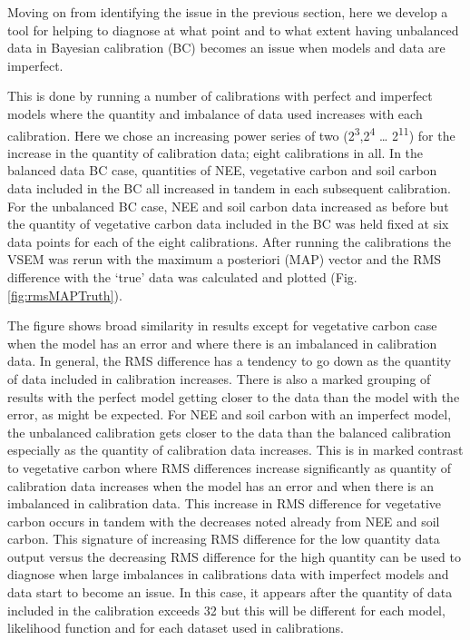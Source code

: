 \documentclass[]{article}
\begin{document}
Moving on from identifying the issue in the previous section, here we
develop a tool for helping to diagnose at what point and to what extent
having unbalanced data in Bayesian calibration (BC) becomes an issue
when models and data are imperfect.

This is done by running a number of calibrations with perfect and
imperfect models where the quantity and imbalance of data used increases
with each calibration. Here we chose an increasing power series of two
(2\textsuperscript{3},2\textsuperscript{4} \ldots{}
2\textsuperscript{11}) for the increase in the quantity of calibration
data; eight calibrations in all. In the balanced data BC case,
quantities of NEE, vegetative carbon and soil carbon data included in
the BC all increased in tandem in each subsequent calibration. For the
unbalanced BC case, NEE and soil carbon data increased as before but the
quantity of vegetative carbon data included in the BC was held fixed at
six data points for each of the eight calibrations. After running the
calibrations the VSEM was rerun with the maximum a posteriori (MAP)
vector and the RMS difference with the `true' data was calculated and
plotted (Fig. \ref{fig:rmsMAPTruth}).

The figure shows broad similarity in results except for vegetative
carbon case when the model has an error and where there is an imbalanced
in calibration data. In general, the RMS difference has a tendency to go
down as the quantity of data included in calibration increases. There is
also a marked grouping of results with the perfect model getting closer
to the data than the model with the error, as might be expected. For NEE
and soil carbon with an imperfect model, the unbalanced calibration gets
closer to the data than the balanced calibration especially as the
quantity of calibration data increases. This is in marked contrast to
vegetative carbon where RMS differences increase significantly as
quantity of calibration data increases when the model has an error and
when there is an imbalanced in calibration data. This increase in RMS
difference for vegetative carbon occurs in tandem with the decreases
noted already from NEE and soil carbon. This signature of increasing RMS
difference for the low quantity data output versus the decreasing RMS
difference for the high quantity can be used to diagnose when large
imbalances in calibrations data with imperfect models and data start to
become an issue. In this case, it appears after the quantity of data
included in the calibration exceeds 32 but this will be different for
each model, likelihood function and for each dataset used in
calibrations.
\end{document}
